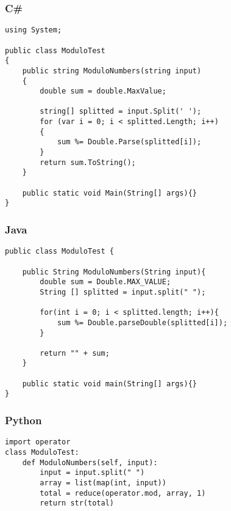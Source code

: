 \subsubsection{C\#}
\lstset{style=sharpc}
\begin{lstlisting}
using System;

public class ModuloTest
{
    public string ModuloNumbers(string input)
    {
        double sum = double.MaxValue;

        string[] splitted = input.Split(' ');
        for (var i = 0; i < splitted.Length; i++)
        {
            sum %= Double.Parse(splitted[i]);
        }
        return sum.ToString();
    }

	public static void Main(String[] args){}
}
\end{lstlisting}


\subsubsection{Java}
\lstset{style=java}
\begin{lstlisting}
public class ModuloTest {

	public String ModuloNumbers(String input){
		double sum = Double.MAX_VALUE;
		String [] splitted = input.split(" ");

		for(int i = 0; i < splitted.length; i++){
			sum %= Double.parseDouble(splitted[i]);
		}

		return "" + sum;
	}

	public static void main(String[] args){}
}

\end{lstlisting}


\subsubsection{Python}
\lstset{style=python}
\begin{lstlisting}
import operator
class ModuloTest:
    def ModuloNumbers(self, input):
        input = input.split(" ")
        array = list(map(int, input))
        total = reduce(operator.mod, array, 1)
        return str(total)
\end{lstlisting}




